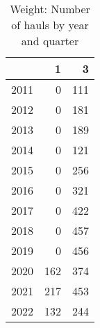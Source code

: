 \begin{table}[ht]
\centering
\begin{tabular}{rrr}
  \hline
 & 1 & 3 \\ 
  \hline
2011 & 0 & 111 \\ 
  2012 & 0 & 181 \\ 
  2013 & 0 & 189 \\ 
  2014 & 0 & 121 \\ 
  2015 & 0 & 256 \\ 
  2016 & 0 & 321 \\ 
  2017 & 0 & 422 \\ 
  2018 & 0 & 457 \\ 
  2019 & 0 & 456 \\ 
  2020 & 162 & 374 \\ 
  2021 & 217 & 453 \\ 
  2022 & 132 & 244 \\ 
   \hline
\end{tabular}
\caption{Weight: Number of hauls by year and quarter} 
\end{table}
